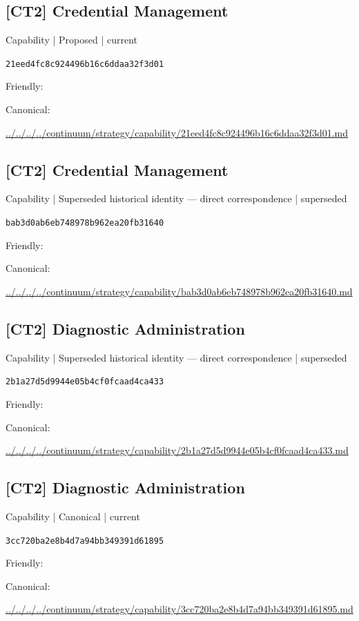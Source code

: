 \documentclass[10pt,a4paper]{article}
\begin{document}
\subsection*{[CT2] Credential Management}
{\small Capability | Proposed | current}\par
\texttt{21eed4fc8c924496b16c6ddaa32f3d01}\par
Friendly: \par
Canonical: \par
{\footnotesize\url{../../../../continuum/strategy/capability/21eed4fc8c924496b16c6ddaa32f3d01.md}}\par
\subsection*{[CT2] Credential Management}
{\small Capability | Superseded historical identity — direct correspondence | superseded}\par
\texttt{bab3d0ab6eb748978b962ea20fb31640}\par
Friendly: \par
Canonical: \par
{\footnotesize\url{../../../../continuum/strategy/capability/bab3d0ab6eb748978b962ea20fb31640.md}}\par
\subsection*{[CT2] Diagnostic Administration}
{\small Capability | Superseded historical identity — direct correspondence | superseded}\par
\texttt{2b1a27d5d9944e05b4cf0fcaad4ca433}\par
Friendly: \par
Canonical: \par
{\footnotesize\url{../../../../continuum/strategy/capability/2b1a27d5d9944e05b4cf0fcaad4ca433.md}}\par
\subsection*{[CT2] Diagnostic Administration}
{\small Capability | Canonical | current}\par
\texttt{3cc720ba2e8b4d7a94bb349391d61895}\par
Friendly: \par
Canonical: \par
{\footnotesize\url{../../../../continuum/strategy/capability/3cc720ba2e8b4d7a94bb349391d61895.md}}\par
\end{document}
